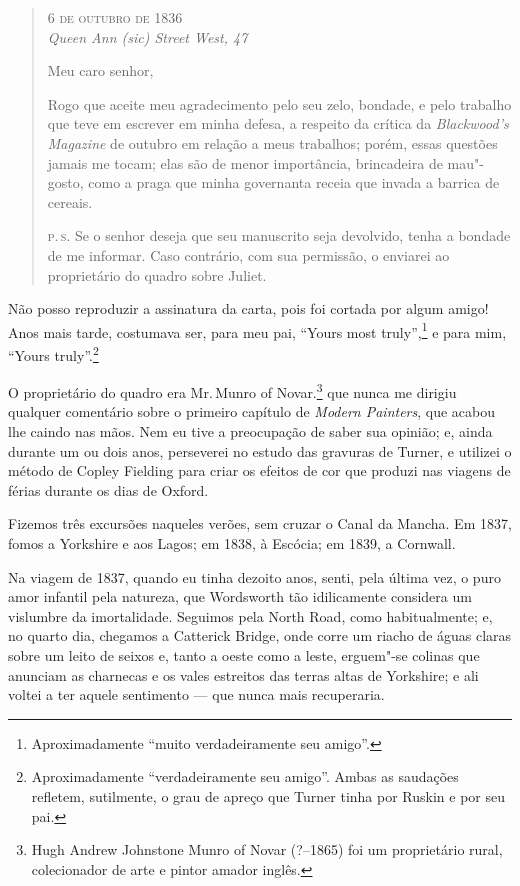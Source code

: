 \medskip

\begin{quote}
\begin{flushright}
\smallskip\hfill\textsc{6 de outubro de 1836}\\
\textit{Queen Ann (\textit{sic}) Street West, 47}
\end{flushright}
\bigskip
Meu caro senhor,

Rogo que aceite meu agradecimento pelo seu zelo,
bondade, e pelo trabalho que teve em escrever em minha defesa, a
respeito da crítica da \textit{Blackwood's Magazine} de outubro em relação
a meus trabalhos; porém, essas questões jamais me tocam; elas são de
menor importância, brincadeira de mau"-gosto, como a praga que minha
governanta receia que invada a barrica de cereais.

\textsc{p.\,s.} Se o senhor deseja que seu manuscrito seja devolvido, tenha a
bondade de me informar. Caso contrário, com sua permissão, o enviarei ao
proprietário do quadro sobre Juliet.
\end{quote}

\medskip

Não posso reproduzir a assinatura da carta, pois foi cortada por algum
amigo! Anos mais tarde, costumava ser, para meu pai, ``Yours most
truly'',\footnote{Aproximadamente ``muito verdadeiramente seu amigo''.} e para mim, ``Yours truly''.\footnote{Aproximadamente
  ``verdadeiramente seu amigo''. Ambas as saudações refletem,
  sutilmente, o grau de apreço que Turner tinha por Ruskin e por seu pai.}

O proprietário do quadro era Mr.\,Munro of Novar.\footnote{Hugh Andrew
  Johnstone Munro of Novar (?--1865) foi um proprietário rural, colecionador de
  arte e pintor amador inglês.} que nunca me dirigiu
qualquer comentário sobre o primeiro capítulo de \textit{Modern Painters},
que acabou lhe caindo nas mãos. Nem eu tive a preocupação de saber sua
opinião; e, ainda durante um ou dois anos, perseverei no estudo das
gravuras de Turner, e utilizei o método de Copley Fielding para criar os
efeitos de cor que produzi nas viagens de férias durante os dias de
Oxford.

Fizemos três excursões naqueles verões, sem cruzar o Canal da
Mancha. Em 1837, fomos a Yorkshire e aos Lagos; em 1838, à Escócia; em
1839, a Cornwall.

Na viagem de 1837, quando eu tinha dezoito anos, senti, pela última vez,
o puro amor infantil pela natureza, que Wordsworth tão idilicamente
considera um vislumbre da imortalidade. Seguimos pela North Road, como
habitualmente; e, no quarto dia, chegamos a Catterick Bridge, onde corre
um riacho de águas claras sobre um leito de seixos e, tanto a oeste como
a leste, erguem"-se colinas que anunciam as charnecas e os vales
estreitos das terras altas de Yorkshire; e ali voltei a ter aquele
sentimento --- que nunca mais recuperaria.

